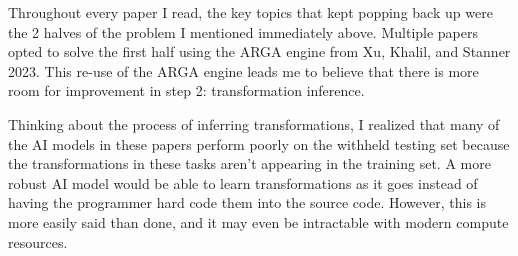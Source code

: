 \documentclass[letterpaper]{article} %
\begin{document}
\bigskip

Throughout every paper I read, the key topics that kept popping back up were the 2 halves of the problem I mentioned immediately above. Multiple papers opted to solve the first half using the ARGA engine from Xu, Khalil, and Stanner 2023. This re-use of the ARGA engine leads me to believe that there is more room for improvement in step 2: transformation inference.

Thinking about the process of inferring transformations, I realized that many of the AI models in these papers perform poorly on the withheld testing set because the transformations in these tasks aren't appearing in the training set. A more robust AI model would be able to learn transformations as it goes instead of having the programmer hard code them into the source code. However, this is more easily said than done, and it may even be intractable with modern compute resources.








\end{document}
